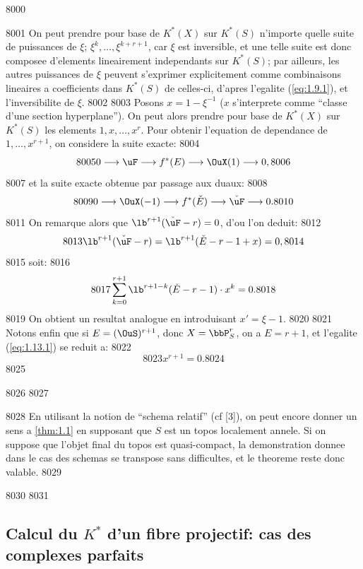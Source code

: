   8000	\begin{rmq}
  8001	On peut prendre pour base de $K^*(X)$ sur $K^*(S)$ n'importe quelle suite de puissances de $\xi$; $\xi^k, \ldots, \xi^{k+r+1}$, car $\xi$ est inversible, et une telle suite est donc composee d'elements lineairement independants sur $K^*(S)$; par ailleurs, les autres puissances de $\xi$ peuvent s'exprimer explicitement comme combinaisons lineaires a coefficients dans $K^*(S)$ de celles-ci, d'apres l'egalite (\ref{eq:1.9.1}), et l'inversibilite de $\xi$.
  8002	
  8003	Posons $x = 1 - \xi^{-1}$ ($x$ s'interprete comme ``classe d'une section hyperplane''). On peut alors prendre pour base de $K^*(X)$ sur $K^*(S)$ les elements $1, x, \ldots, x^r$. Pour obtenir l'equation de dependance de $1, \ldots, x^{r+1}$, on considere la suite exacte:
  8004	\[
  8005	0 \longrightarrow \uF \longrightarrow f^*(E) \longrightarrow \OuX(1) \longrightarrow 0,
  8006	\]
  8007	et la suite exacte obtenue par passage aux duaux:
  8008	\[
  8009	0 \longrightarrow \OuX(-1) \longrightarrow f^*(\check{E}) \longrightarrow \check{\uF} \longrightarrow 0.
  8010	\]
  8011	On remarque alors que $\lb^{r+1}(\check{\uF} - r) = 0$, d'ou l'on deduit:
  8012	\[
  8013	\lb^{r+1}(\check{\uF} - r) = \lb^{r+1}(\check{E} - r - 1 + x) = 0,
  8014	\]
  8015	soit:
  8016	\begin{equation}\label{eq:1.13.1}
  8017	\sum_{k=0}^{r+1} \lb^{r+1-k}(\check{E} - r - 1) \cdot x^k = 0.
  8018	\end{equation}
  8019	On obtient un resultat analogue en introduisant $x' = \xi - 1$.
  8020	
  8021	Notons enfin que si $E = (\OuS)^{r+1}$, donc $X = \bbP^r_S$, on a $E = r+1$, et l'egalite (\ref{eq:1.13.1}) se reduit a:
  8022	\begin{equation}\label{eq:1.13.2}
  8023	x^{r+1} = 0.
  8024	\end{equation}
  8025	\end{rmq}
  8026	
  8027	\begin{rmq}
  8028	En utilisant la notion de ``schema relatif'' (cf [3]), on peut encore donner un sens a \ref{thm:1.1} en supposant que $S$ est un topos localement annele. Si on suppose que l'objet final du topos est quasi-compact, la demonstration donnee dans le cas des schemas se transpose sans difficultes, et le theoreme reste donc valable.
  8029	\end{rmq}
  8030	
  8031		\subsection{Calcul du $K^*$ d'un fibre projectif: cas des complexes parfaits}
